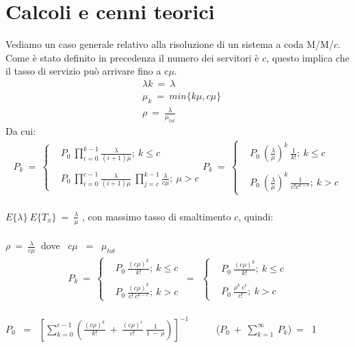 \documentclass[12pt,a4paper]{article}
\begin{document}
\section{Calcoli e cenni teorici}
Vediamo un caso generale relativo alla risoluzione di un sistema a coda M/M/$c$. Come è stato definito in precedenza il numero dei servitori è $c$, questo implica che il tasso di servizio può arrivare fino a c$\mu$.
    \begin{align*}
    &\lambda k \ = \ \lambda \\
    &\mu_{k} \ = \ min \{k\mu , c\mu\} \\
    &\rho \ = \ \frac{\lambda}{\mu_{tot}}
    \end{align*}
    Da cui:
    \begin{align*}
    P_{k} \ = \
    \begin{cases}
     &P_{0} \ \prod_{i = 0}^{k - 1}\frac{\lambda}{(i + 1) \mu};\ k \le c\\ \\
     &P_{0} \ \prod_{i = 0}^{c - 1}\frac{\lambda}{(i + 1) \mu}\ \prod_{j = c}^{k - 1}\frac{\lambda}{c \mu}; \ \mu > c
     \end{cases}
    P_{k} \ = \
    \begin{cases}
     &P_{0} \ (\frac{\lambda}{\mu})^{k} \ \frac{1}{k!};\ k \le c\\ \\
     &P_{0} \ (\frac{\lambda}{\mu})^{k} \ \frac{1}{c!c^{k-c}}; \ k > c
    \end{cases}
    \end{align*} \\

    $E\{\lambda\} \ E\{T_{x}\} \ = \ \frac{\lambda}{\mu}$ , con massimo tasso di smaltimento $c$, quindi: \\ \\
    $\rho \ = \ \frac{\lambda}{c \mu} \ $ dove \ $c\mu$ \ = \ $\mu_{tot}$ \\ 

    \begin{align*}
    P_{k} \ = \
    \begin{cases}
     &P_{0} \ \frac{(c\rho)^{k}}{k!};\ k \le c\\ \\
     &P_{0} \ \frac{(c\rho)^{k}}{c! \ c^{k-c}}; \ k > c
     \end{cases}
     \ = \ \
    \begin{cases}
     &P_{0} \ \frac{(c\rho)^{k}}{k!};\ k \le c\\ \\
     &P_{0} \ \frac{\rho^{k} \ c^{c}}{c!}; \ k > c
    \end{cases}
    \end{align*} \\
    $P_{0}$ \ = \ $[\sum^{c-1}_{k=0}(\frac{(c\rho)^{k}}{k!} \ + \ \frac{(c\rho)^{c}}{c!} \ \frac{1}{1 \ - \ \rho})]^{-1}$ \ \ \ \ \ ($P_{0} \ + \ \sum^{\infty}_{k=1} \ P_{k}$)\ = \ 1 \\ \\
\end{document}
